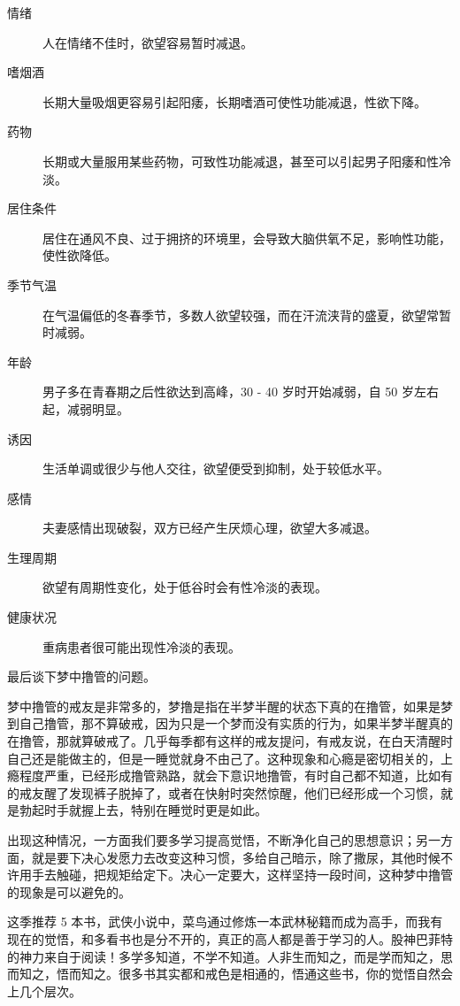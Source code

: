 \documentclass[fontset=founder]{ctexart}
\begin{document}
\begin{description}
    \item[情绪] 人在情绪不佳时，欲望容易暂时减退。
    \item[嗜烟酒] 长期大量吸烟更容易引起阳痿，长期嗜酒可使性功能减退，性欲下降。
    \item[药物] 长期或大量服用某些药物，可致性功能减退，甚至可以引起男子阳痿和性冷淡。
    \item[居住条件] 居住在通风不良、过于拥挤的环境里，会导致大脑供氧不足，影响性功能，使性欲降低。
    \item[季节气温] 在气温偏低的冬春季节，多数人欲望较强，而在汗流浃背的盛夏，欲望常暂时减弱。
    \item[年龄] 男子多在青春期之后性欲达到高峰，30 - 40 岁时开始减弱，自 50 岁左右起，减弱明显。
    \item[诱因] 生活单调或很少与他人交往，欲望便受到抑制，处于较低水平。
    \item[感情] 夫妻感情出现破裂，双方已经产生厌烦心理，欲望大多减退。
    \item[生理周期] 欲望有周期性变化，处于低谷时会有性冷淡的表现。
    \item[健康状况] 重病患者很可能出现性冷淡的表现。
\end{description}

最后谈下梦中撸管的问题。

梦中撸管的戒友是非常多的，梦撸是指在半梦半醒的状态下真的在撸管，如果是梦到自己撸管，那不算破戒，因为只是一个梦而没有实质的行为，如果半梦半醒真的在撸管，那就算破戒了。几乎每季都有这样的戒友提问，有戒友说，在白天清醒时自己还是能做主的，但是一睡觉就身不由己了。这种现象和心瘾是密切相关的，上瘾程度严重，已经形成撸管熟路，就会下意识地撸管，有时自己都不知道，比如有的戒友醒了发现裤子脱掉了，或者在快射时突然惊醒，他们已经形成一个习惯，就是勃起时手就握上去，特别在睡觉时更是如此。

出现这种情况，一方面我们要多学习提高觉悟，不断净化自己的思想意识；另一方面，就是要下决心发愿力去改变这种习惯，多给自己暗示，除了撒尿，其他时候不许用手去触碰，把规矩给定下。决心一定要大，这样坚持一段时间，这种梦中撸管的现象是可以避免的。

这季推荐 5 本书，武侠小说中，菜鸟通过修炼一本武林秘籍而成为高手，而我有现在的觉悟，和多看书也是分不开的，真正的高人都是善于学习的人。股神巴菲特的神力来自于阅读！多学多知道，不学不知道。人非生而知之，而是学而知之，思而知之，悟而知之。很多书其实都和戒色是相通的，悟通这些书，你的觉悟自然会上几个层次。
\end{document}
